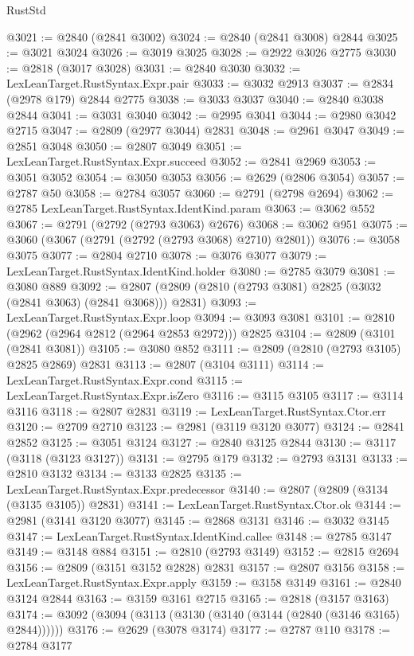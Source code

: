 \begin{lexlean}{RustStd}
\begin{coremodule}
@3021 := @2840 (@2841 @3002)
@3024 := @2840 (@2841 @3008) @2844
@3025 := @3021 @3024
@3026 := @3019 @3025
@3028 := @2922 @3026 @2775
@3030 := @2818 (@3017 @3028)
@3031 := @2840 @3030
@3032 := LexLeanTarget.RustSyntax.Expr.pair
@3033 := @3032 @2913
@3037 := @2834 (@2978 @179) @2844 @2775
@3038 := @3033 @3037
@3040 := @2840 @3038 @2844
@3041 := @3031 @3040
@3042 := @2995 @3041
@3044 := @2980 @3042 @2715
@3047 := @2809 (@2977 @3044) @2831
@3048 := @2961 @3047
@3049 := @2851 @3048
@3050 := @2807 @3049
@3051 := LexLeanTarget.RustSyntax.Expr.succeed
@3052 := @2841 @2969
@3053 := @3051 @3052
@3054 := @3050 @3053
@3056 := @2629 (@2806 @3054)
@3057 := @2787 @50
@3058 := @2784 @3057
@3060 := @2791 (@2798 @2694)
@3062 := @2785 LexLeanTarget.RustSyntax.IdentKind.param
@3063 := @3062 @552
@3067 := @2791 (@2792 (@2793 @3063) @2676)
@3068 := @3062 @951
@3075 := @3060 (@3067 (@2791 (@2792 (@2793 @3068) @2710) @2801))
@3076 := @3058 @3075
@3077 := @2804 @2710
@3078 := @3076 @3077
@3079 := LexLeanTarget.RustSyntax.IdentKind.holder
@3080 := @2785 @3079
@3081 := @3080 @889
@3092 := @2807 (@2809 (@2810 (@2793 @3081) @2825 (@3032 (@2841 @3063) (@2841 @3068))) @2831)
@3093 := LexLeanTarget.RustSyntax.Expr.loop
@3094 := @3093 @3081
@3101 := @2810 (@2962 (@2964 @2812 (@2964 @2853 @2972))) @2825
@3104 := @2809 (@3101 (@2841 @3081))
@3105 := @3080 @852
@3111 := @2809 (@2810 (@2793 @3105) @2825 @2869) @2831
@3113 := @2807 (@3104 @3111)
@3114 := LexLeanTarget.RustSyntax.Expr.cond
@3115 := LexLeanTarget.RustSyntax.Expr.isZero
@3116 := @3115 @3105
@3117 := @3114 @3116
@3118 := @2807 @2831
@3119 := LexLeanTarget.RustSyntax.Ctor.err
@3120 := @2709 @2710
@3123 := @2981 (@3119 @3120 @3077)
@3124 := @2841 @2852
@3125 := @3051 @3124
@3127 := @2840 @3125 @2844
@3130 := @3117 (@3118 (@3123 @3127))
@3131 := @2795 @179
@3132 := @2793 @3131
@3133 := @2810 @3132
@3134 := @3133 @2825
@3135 := LexLeanTarget.RustSyntax.Expr.predecessor
@3140 := @2807 (@2809 (@3134 (@3135 @3105)) @2831)
@3141 := LexLeanTarget.RustSyntax.Ctor.ok
@3144 := @2981 (@3141 @3120 @3077)
@3145 := @2868 @3131
@3146 := @3032 @3145
@3147 := LexLeanTarget.RustSyntax.IdentKind.callee
@3148 := @2785 @3147
@3149 := @3148 @884
@3151 := @2810 (@2793 @3149)
@3152 := @2815 @2694
@3156 := @2809 (@3151 @3152 @2828) @2831
@3157 := @2807 @3156
@3158 := LexLeanTarget.RustSyntax.Expr.apply
@3159 := @3158 @3149
@3161 := @2840 @3124 @2844
@3163 := @3159 @3161 @2715
@3165 := @2818 (@3157 @3163)
@3174 := @3092 (@3094 (@3113 (@3130 (@3140 (@3144 (@2840 (@3146 @3165) @2844))))))
@3176 := @2629 (@3078 @3174)
@3177 := @2787 @110
@3178 := @2784 @3177

\end{coremodule}
\end{lexlean}
